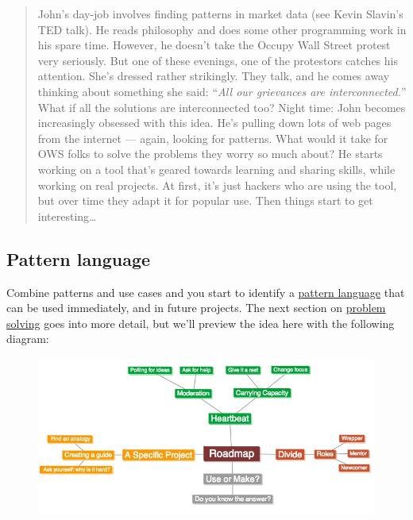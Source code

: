 \begin{quote}
John's day-job involves finding patterns in market data (see Kevin
Slavin's TED talk). He reads philosophy and does some other
programming work in his spare time. However, he doesn't take the
Occupy Wall Street protest very seriously. But one of these evenings,
one of the protestors catches his attention. She's dressed rather
strikingly. They talk, and he comes away thinking about something she
said: ``\emph{All our grievances are interconnected.}'' What if all
the solutions are interconnected too? Night time: John becomes
increasingly obsessed with this idea. He's pulling down lots of web
pages from the internet --- again, looking for patterns. What would it
take for OWS folks to solve the problems they worry so much about? He
starts working on a tool that's geared towards learning and sharing
skills, while working on real projects. At first, it's just hackers
who are using the tool, but over time they adapt it for popular use.
Then things start to get interesting\ldots{}
\end{quote}

\subsection{Pattern language}

Combine patterns and use cases and you start to identify a
\href{http://peeragogy.org/practice/heuristics/pattern-language/}{pattern
language} that can be used immediately, and in future projects. The next
section on \href{http://peeragogy.org/practice/heuristics/}{problem
solving} goes into more detail, but we'll preview the idea here with the
following diagram:

\begin{figure}[htbp]
\centering
\includegraphics[width=\textwidth]{../pictures/pattern-map1.jpg}
\end{figure}

